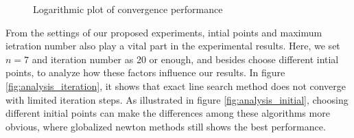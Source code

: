 \begin{figure}[!htbp]
    \centering
    \caption{Logarithmic plot of convergence performance}
    \label{fig:log_performance_comparison}  
\end{figure}
From the settings of our proposed experiments, intial points and maximum ietration number also play a vital part in the experimental results. Here, we set $n=7$ and iteration number as 20 or enough, and besides choose different intial points, to analyze how these factors influence our results. In figure \ref{fig:analysis_iteration}, it shows that exact line search method does not converge with limited iteration steps. As illustrated in figure \ref{fig:analysis_initial}, choosing different initial points can make the differences among these algorithms more obvious, where globalized newton methods still shows the best performance. 
